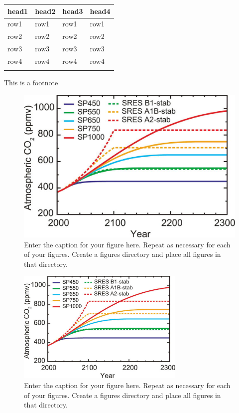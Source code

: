 \documentclass{bioinfo}
\begin{document}
\begin{methods}
\begin{table}[!t]
{\begin{tabular}{llll}\toprule
head1 & head2 & head3 & head4\\\midrule
row1 & row1 & row1 & row1\\
row2 & row2 & row2 & row2\\
row3 & row3 & row3 & row3\\
row4 & row4 & row4 & row4\\\botrule
\end{tabular}}{This is a footnote}
\end{table}

\end{methods}

\begin{figure}[htp]%
\centerline{\includegraphics[width=38pc,angle=0]{./figures/figure01.eps}}
\caption{Enter the caption for your figure here.  Repeat as
  necessary for each of your figures. Create a figures directory and
  place all figures in that directory.}\label{fig:01}
\end{figure}

\begin{figure}[htp]%
\centerline{\includegraphics[width=19pc,angle=0]{./figures/figure01.eps}}
\caption{Enter the caption for your figure here.  Repeat as
  necessary for each of your figures. Create a figures directory and
  place all figures in that directory.}\label{fig:02}
\end{figure}
\end{document}
